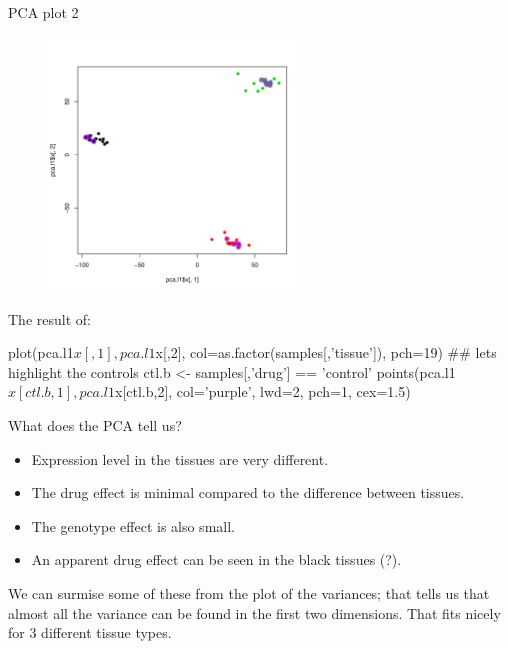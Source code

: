 \documentclass[pdf]{beamer}
\begin{document}
\begin{frame}[fragile]{PCA plot 2}
  \begin{figure}[ht]
    \includegraphics[width=0.6\textwidth]{images/pca2}
  \end{figure}
  \vspace{-4em}
  The result of:
  \begin{rcode}
  plot(pca.l1$x[,1], pca.l1$x[,2], col=as.factor(samples[,'tissue']), pch=19)
  ## lets highlight the controls
  ctl.b <- samples[,'drug'] == 'control'
  points(pca.l1$x[ctl.b,1], pca.l1$x[ctl.b,2], col='purple', lwd=2, pch=1, cex=1.5)
  \end{rcode}
\end{frame}

\begin{frame}{What does the PCA tell us?}
  \begin{itemize}
  \item Expression level in the tissues are very different.
  \item The drug effect is minimal compared to the difference between tissues.
  \item The genotype effect is also small.
  \item An apparent drug effect can be seen in the black tissues (?).
  \end{itemize}
  
  We can surmise some of these from the plot of the variances; that tells us that
  almost all the variance can be found in the first two dimensions. That fits nicely
  for 3 different tissue types.

  
\end{frame}
\end{document}
